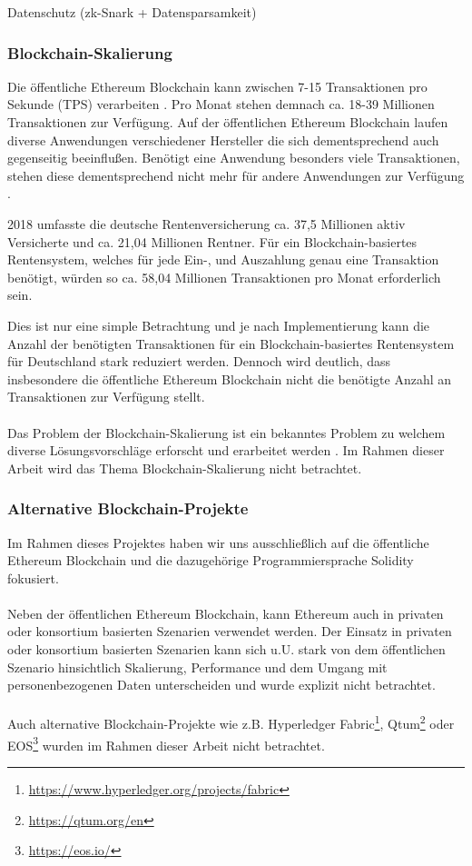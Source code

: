Datenschutz (zk-Snark + Datensparsamkeit)

\subsubsection{Blockchain-Skalierung}
Die öffentliche Ethereum Blockchain kann zwischen 7-15 Transaktionen pro Sekunde (TPS) verarbeiten \cite{vitalikscale}. Pro Monat stehen demnach ca. 18-39 Millionen Transaktionen zur Verfügung. Auf der öffentlichen Ethereum Blockchain laufen diverse Anwendungen verschiedener Hersteller die sich dementsprechend auch gegenseitig beeinflußen. Benötigt eine Anwendung besonders viele Transaktionen, stehen diese dementsprechend nicht mehr für andere Anwendungen zur Verfügung \cite{cryptokitty}.  

2018 umfasste die deutsche Rentenversicherung ca. 37,5 Millionen aktiv Versicherte und ca. 21,04 Millionen Rentner. \cite{rente2018,rentezahlen2019} Für ein Blockchain-basiertes Rentensystem, welches für jede Ein-, und Auszahlung genau eine Transaktion benötigt, würden so ca. 58,04 Millionen Transaktionen pro Monat erforderlich sein.

Dies ist nur eine simple Betrachtung und je nach Implementierung kann die Anzahl der benötigten Transaktionen für ein Blockchain-basiertes Rentensystem für Deutschland stark reduziert werden. Dennoch wird deutlich, dass insbesondere die öffentliche Ethereum Blockchain nicht die benötigte Anzahl an Transaktionen zur Verfügung stellt.

\paragraph*{}
Das Problem der Blockchain-Skalierung ist ein bekanntes Problem zu welchem diverse Lösungsvorschläge erforscht und erarbeitet werden \cite{scaling}. Im Rahmen dieser Arbeit wird das Thema Blockchain-Skalierung nicht betrachtet.

\subsubsection{Alternative Blockchain-Projekte}
Im Rahmen dieses Projektes haben wir uns ausschließlich auf die öffentliche Ethereum Blockchain und die dazugehörige Programmiersprache Solidity fokusiert.

\paragraph*{}
Neben der öffentlichen Ethereum Blockchain, kann Ethereum auch in privaten oder konsortium basierten Szenarien verwendet werden. Der Einsatz in privaten oder konsortium basierten Szenarien kann sich u.U. stark von dem öffentlichen Szenario hinsichtlich Skalierung, Performance und dem Umgang mit personenbezogenen Daten unterscheiden und wurde explizit nicht betrachtet.

\paragraph*{}
Auch alternative Blockchain-Projekte wie z.B. 
Hyperledger Fabric\footnote{\url{https://www.hyperledger.org/projects/fabric}}, 
Qtum\footnote{\url{https://qtum.org/en}}
oder EOS\footnote{\url{https://eos.io/}}
wurden im Rahmen dieser Arbeit nicht betrachtet. 